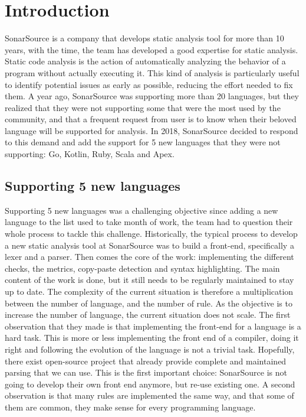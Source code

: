\section{Introduction}
\label{sec:introduction}
SonarSource is a company that develops static analysis tool for more than 10 years, with the time, the team has developed a good expertise for static analysis.
Static code analysis is the action of automatically analyzing the behavior of a program without actually executing it.
This kind of analysis is particularly useful to identify potential issues as early as possible, reducing the effort needed to fix them.
A year ago, SonarSource was supporting more than 20 languages, but they realized that they were not supporting some that were the most used by the community, and that a frequent request from user is to know when their beloved language will be supported for analysis. 
In 2018, SonarSource decided to respond to this demand and add the support for 5 new languages that they were not supporting: Go, Kotlin, Ruby, Scala and Apex.

\subsection{Supporting 5 new languages}
\label{subsec:5_new_languages}
Supporting 5 new languages was a challenging objective since adding a new language to the list used to take month of work, the team had to question their whole process to tackle this challenge.
Historically, the typical process to develop a new static analysis tool at SonarSource was to build a front-end, specifically a lexer and a parser.
Then comes the core of the work: implementing the different checks, the metrics, copy-paste detection and syntax highlighting. The main content of the work is done, but it still needs to be regularly maintained to stay up to date.
The complexity of the current situation is therefore a multiplication between the number of language, and the number of rule. 
As the objective is to increase the number of language, the current situation does not scale.
The first observation that they made is that implementing the front-end for a language is a hard task. This is more or less implementing the front end of a compiler, doing it right and following the evolution of the language is not a trivial task.
Hopefully, there exist open-source project that already provide complete and maintained parsing that we can use. 
This is the first important choice: SonarSource is not going to develop their own front end anymore, but re-use existing one.
A second observation is that many rules are implemented the same way, and that some of them are common, they make sense for every programming language.


